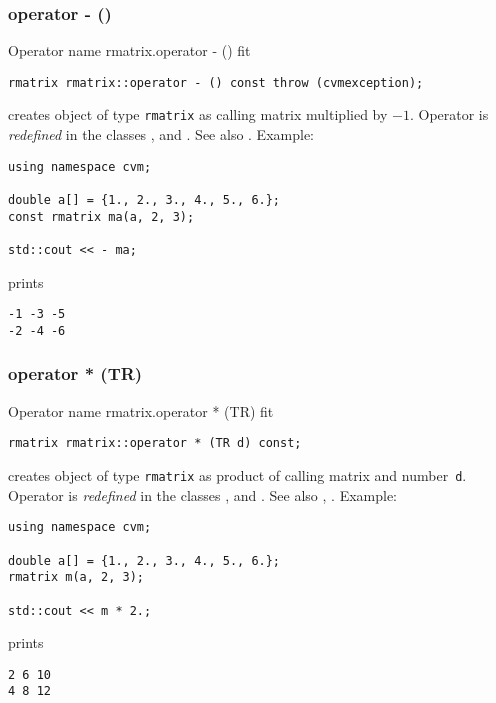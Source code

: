 \subsubsection{operator - ()}
Operator%
\pdfdest name {rmatrix.operator - ()} fit
\begin{verbatim}
rmatrix rmatrix::operator - () const throw (cvmexception);
\end{verbatim}
creates  object of type \verb"rmatrix" as
 calling matrix multiplied by $-1$.
Operator is \emph{redefined} in the classes
, 
and .
See also .
Example:
\begin{Verbatim}
using namespace cvm;

double a[] = {1., 2., 3., 4., 5., 6.};
const rmatrix ma(a, 2, 3);

std::cout << - ma;
\end{Verbatim}
prints
\begin{Verbatim}
-1 -3 -5
-2 -4 -6
\end{Verbatim}
\newpage



\subsubsection{operator * (TR)}
Operator%
\pdfdest name {rmatrix.operator * (TR)} fit
\begin{verbatim}
rmatrix rmatrix::operator * (TR d) const;
\end{verbatim}
creates  object of type \verb"rmatrix" as product of
 calling matrix and  number~\verb"d".
Operator is \emph{redefined} in the classes
, 
and .
See also ,
.
Example:
\begin{Verbatim}
using namespace cvm;

double a[] = {1., 2., 3., 4., 5., 6.};
rmatrix m(a, 2, 3);

std::cout << m * 2.;
\end{Verbatim}
prints
\begin{Verbatim}
2 6 10
4 8 12
\end{Verbatim}
\newpage



